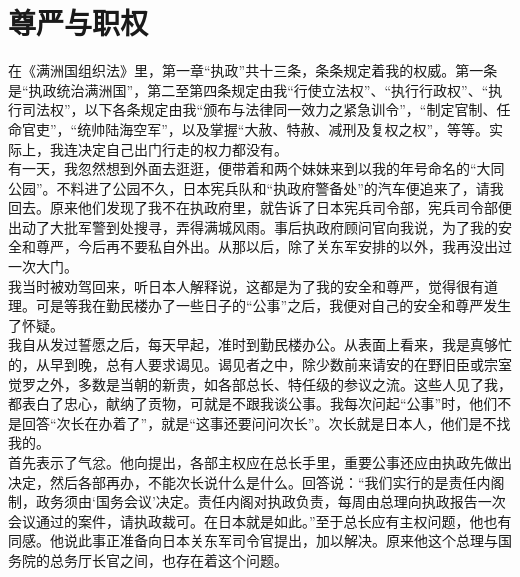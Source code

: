 \fancyhead[RO]{} %
\fancyhead[LE]{} %
\chapter*{尊严与职权}
\thispagestyle{empty}
在《满洲国组织法》里，第一章“执政”共十三条，条条规定着我的权威。第一条是“执政统治满洲国”，第二至第四条规定由我“行使立法权”、“执行行政权”、“执行司法权”，以下各条规定由我“颁布与法律同一效力之紧急训令”，“制定官制、任命官吏”，“统帅陆海空军”，以及掌握“大赦、特赦、减刑及复权之权”，等等。实际上，我连决定自己出门行走的权力都没有。\\

有一天，我忽然想到外面去逛逛，便带着和两个妹妹来到以我的年号命名的“大同公园”。不料进了公园不久，日本宪兵队和“执政府警备处”的汽车便追来了，请我回去。原来他们发现了我不在执政府里，就告诉了日本宪兵司令部，宪兵司令部便出动了大批军警到处搜寻，弄得满城风雨。事后执政府顾问官向我说，为了我的安全和尊严，今后再不要私自外出。从那以后，除了关东军安排的以外，我再没出过一次大门。\\

我当时被劝驾回来，听日本人解释说，这都是为了我的安全和尊严，觉得很有道理。可是等我在勤民楼办了一些日子的“公事”之后，我便对自己的安全和尊严发生了怀疑。\\

我自从发过誓愿之后，每天早起，准时到勤民楼办公。从表面上看来，我是真够忙的，从早到晚，总有人要求谒见。谒见者之中，除少数前来请安的在野旧臣或宗室觉罗之外，多数是当朝的新贵，如各部总长、特任级的参议之流。这些人见了我，都表白了忠心，献纳了贡物，可就是不跟我谈公事。我每次问起“公事”时，他们不是回答“次长在办着了”，就是“这事还要问问次长”。次长就是日本人，他们是不找我的。\\

首先表示了气忿。他向提出，各部主权应在总长手里，重要公事还应由执政先做出决定，然后各部再办，不能次长说什么是什么。回答说：“我们实行的是责任内阁制，政务须由‘国务会议’决定。责任内阁对执政负责，每周由总理向执政报告一次会议通过的案件，请执政裁可。在日本就是如此。”至于总长应有主权问题，他也有同感。他说此事正准备向日本关东军司令官提出，加以解决。原来他这个总理与国务院的总务厅长官之间，也存在着这个问题。\\

